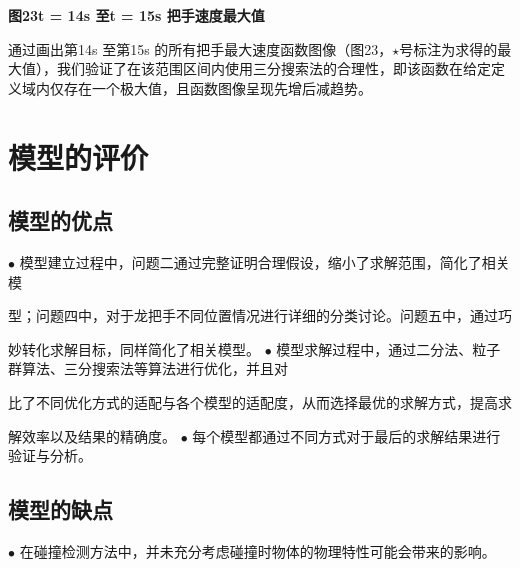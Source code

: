 \documentclass[withoutpreface,bwprint]{cumcmthesis}
\begin{document}
{\centering\textbf{图23\quad t = 14s 至t = 15s 把手速度最大值}\par}

通过画出第14s 至第15s 的所有把手最大速度函数图像（图23，\(\star\)号标注为求得的最大值），我们验证了在该范围区间内使用三分搜索法的合理性，即该函数在给定定义域内仅存在一个极大值，且函数图像呈现先增后减趋势。

\section{模型的评价}
\subsection{模型的优点}
$\bullet$ 模型建立过程中，问题二通过完整证明合理假设，缩小了求解范围，简化了相关模

型；问题四中，对于龙把手不同位置情况进行详细的分类讨论。问题五中，通过巧

妙转化求解目标，同样简化了相关模型。 $\bullet$ 模型求解过程中，通过二分法、粒子群算法、三分搜索法等算法进行优化，并且对

比了不同优化方式的适配与各个模型的适配度，从而选择最优的求解方式，提高求

解效率以及结果的精确度。 $\bullet$ 每个模型都通过不同方式对于最后的求解结果进行验证与分析。

\subsection{模型的缺点}
$\bullet$ 在碰撞检测方法中，并未充分考虑碰撞时物体的物理特性可能会带来的影响。
\end{document}
